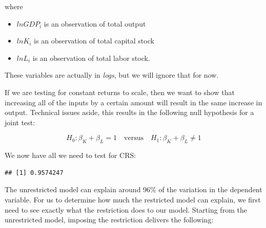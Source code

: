 \documentclass[
]{book}
\newenvironment{Shaded}{\begin{snugshade}}{\end{snugshade}}
\newcommand{\AttributeTok}[1]{\textcolor[rgb]{0.13,0.29,0.53}{#1}}
\newcommand{\CommentTok}[1]{\textcolor[rgb]{0.56,0.35,0.01}{\textit{#1}}}
\newcommand{\FunctionTok}[1]{\textcolor[rgb]{0.13,0.29,0.53}{\textbf{#1}}}
\newcommand{\NormalTok}[1]{#1}
\newcommand{\OtherTok}[1]{\textcolor[rgb]{0.56,0.35,0.01}{#1}}
\newcommand{\SpecialCharTok}[1]{\textcolor[rgb]{0.81,0.36,0.00}{\textbf{#1}}}
\newcommand{\StringTok}[1]{\textcolor[rgb]{0.31,0.60,0.02}{#1}}
\begin{document}
where

\begin{itemize}
\item
  \(lnGDP_i\) is an observation of total output
\item
  \(lnK_i\) is an observation of total capital stock
\item
  \(lnL_i\) is an observation of total labor stock.
\end{itemize}

These variables are actually in \emph{logs}, but we will ignore that for now.

If we are testing for constant returns to scale, then we want to show that increasing all of the inputs by a certain amount will result in the same increase in output. Technical issues aside, this results in the following null hypothesis for a joint test:

\[H_0: \beta_K + \beta_L = 1 \quad \text{versus} \quad H_1: \beta_K + \beta_L \neq 1\]

We now have all we need to test for CRS:

\begin{Shaded}
\end{Shaded}

\begin{verbatim}
## [1] 0.9574247
\end{verbatim}

The unrestricted model can explain around 96\% of the variation in the dependent variable. For us to determine how much the restricted model can explain, we first need to see exactly what the restriction does to our model. Starting from the unrestricted model, imposing the restriction delivers the following:
\end{document}
